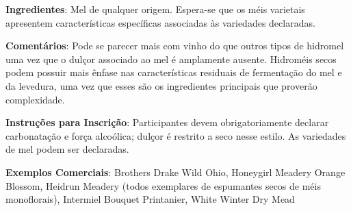 \textbf{Ingredientes}: Mel de qualquer origem. Espera-se que os méis varietais apresentem características específicas associadas às variedades declaradas.

\textbf{Comentários}: Pode se parecer mais com vinho do que outros tipos de hidromel uma vez que o dulçor associado ao mel é amplamente ausente. Hidroméis secos podem possuir mais ênfase nas características residuais de fermentação do mel e da levedura, uma vez que esses são os ingredientes principais que proverão complexidade.

\textbf{Instruções para Inscrição}: Participantes devem obrigatoriamente declarar carbonatação e força alcoólica; dulçor é restrito a seco nesse estilo. As variedades de mel podem ser declaradas.

\textbf{Exemplos Comerciais}: Brothers Drake Wild Ohio, Honeygirl Meadery Orange Blossom, Heidrun Meadery (todos exemplares de espumantes secos de méis monoflorais), Intermiel Bouquet Printanier, White Winter Dry Mead